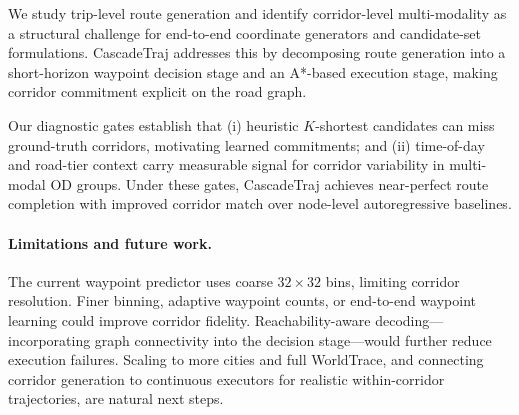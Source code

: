 
We study trip-level route generation and identify corridor-level multi-modality as a structural challenge for end-to-end coordinate generators and candidate-set formulations.
CascadeTraj addresses this by decomposing route generation into a short-horizon waypoint decision stage and an A*-based execution stage, making corridor commitment explicit on the road graph.

Our diagnostic gates establish that (i) heuristic $K$-shortest candidates can miss ground-truth corridors, motivating learned commitments; and (ii) time-of-day and road-tier context carry measurable signal for corridor variability in multi-modal OD groups.
Under these gates, CascadeTraj achieves near-perfect route completion with improved corridor match over node-level autoregressive baselines.

\paragraph{Limitations and future work.}
The current waypoint predictor uses coarse $32 \times 32$ bins, limiting corridor resolution.
Finer binning, adaptive waypoint counts, or end-to-end waypoint learning could improve corridor fidelity.
Reachability-aware decoding---incorporating graph connectivity into the decision stage---would further reduce execution failures.
Scaling to more cities and full WorldTrace, and connecting corridor generation to continuous executors for realistic within-corridor trajectories, are natural next steps.
